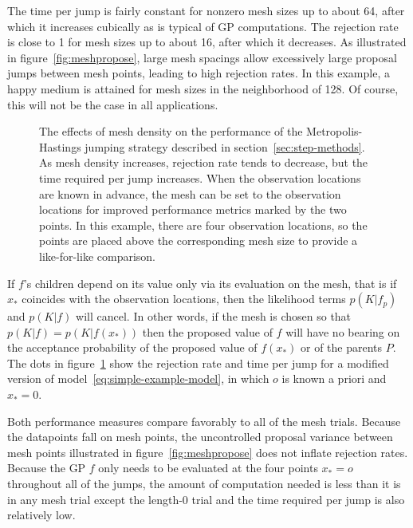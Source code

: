 \documentclass[article]{jss}
\begin{document}
The time per jump is fairly constant for nonzero mesh sizes up to about 64, after which it increases cubically as is typical of GP computations. The rejection rate is close to 1 for mesh sizes up to about 16, after which it decreases. As illustrated in figure~\ref{fig:meshpropose}, large mesh spacings allow excessively large proposal jumps between mesh points, leading to high rejection rates. In this example, a happy medium is attained for mesh sizes in the neighborhood of 128. Of course, this will not be the case in all applications.

\begin{figure}
    \centering
    \caption{The effects of mesh density on the performance of the Metropolis-Hastings jumping strategy described in section~\ref{sec:step-methods}. As mesh density increases, rejection rate tends to decrease, but the time required per jump increases. When the observation locations are known in advance, the mesh can be set to the observation locations for improved performance metrics marked by the two points. In this example, there are four observation locations, so the points are placed above the corresponding mesh size to provide a like-for-like comparison.}
    \label{fig:meshchoice}
\end{figure}

If $f$'s children depend on its value only via its evaluation on the mesh, that is if $x_*$ coincides with the observation locations, then the likelihood terms $p(K|f_p)$ and $p(K|f)$ will cancel. In other words, if the mesh is chosen so that $p(K|f)=p(K|f(x_*))$ then the proposed value of $f$ will have no bearing on the acceptance probability of the proposed value of $f(x_*)$ or of the parents $P$. The dots in figure~\ref{fig:meshchoice} show the rejection rate and time per jump for a modified version of model~\ref{eq:simple-example-model}, in which $o$ is known a priori and $x_*=0$. 

Both performance measures compare favorably to all of the mesh trials. Because the datapoints fall on mesh points, the uncontrolled proposal variance between mesh points illustrated in figure~\ref{fig:meshpropose} does not inflate rejection rates. Because the GP $f$ only needs to be evaluated at the four points $x_*=o$ throughout all of the jumps, the amount of computation needed is less than it is in any mesh trial except the length-0 trial and the time required per jump is also relatively low.
\end{document}

